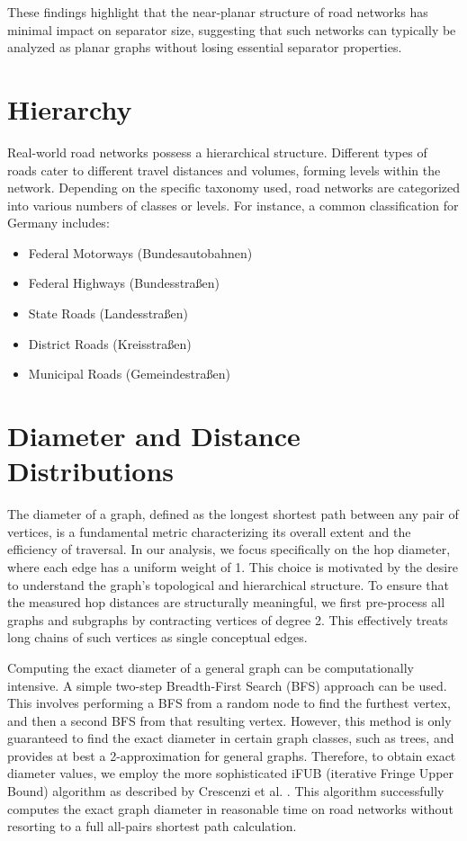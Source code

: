 These findings highlight that the near-planar structure of road networks has minimal impact on separator size, suggesting that such networks can typically be analyzed as planar graphs without losing essential separator properties.

\section{Hierarchy}
\label{sec:hierarchy}

Real-world road networks possess a hierarchical structure.
Different types of roads cater to different travel distances and volumes, forming levels within the network.
Depending on the specific taxonomy used, road networks are categorized into various numbers of classes or levels.
For instance, a common classification for Germany includes:

\begin{itemize}
    \item Federal Motorways (Bundesautobahnen)
    \item Federal Highways (Bundesstraßen)
    \item State Roads (Landesstraßen)
    \item District Roads (Kreisstraßen)
    \item Municipal Roads (Gemeindestraßen)
\end{itemize}

\section{Diameter and Distance Distributions}
\label{sec:diameter}

The diameter of a graph, defined as the longest shortest path between any pair of vertices, is a fundamental metric characterizing its overall extent and the efficiency of traversal.
In our analysis, we focus specifically on the hop diameter, where each edge has a uniform weight of 1.
This choice is motivated by the desire to understand the graph's topological and hierarchical structure.
To ensure that the measured hop distances are structurally meaningful, we first pre-process all graphs and subgraphs by contracting vertices of degree 2.
This effectively treats long chains of such vertices as single conceptual edges.

Computing the exact diameter of a general graph can be computationally intensive.
A simple two-step Breadth-First Search (BFS) approach can be used. This involves performing a BFS from a random node to find the furthest vertex, and then a second BFS from that resulting vertex. However, this method is only guaranteed to find the exact diameter in certain graph classes, such as trees, and provides at best a 2-approximation for general graphs.
Therefore, to obtain exact diameter values, we employ the more sophisticated iFUB (iterative Fringe Upper Bound) algorithm as described by Crescenzi et al. \cite{crescenzi_computing_2013}.
This algorithm successfully computes the exact graph diameter in reasonable time on road networks without resorting to a full all-pairs shortest path calculation.

